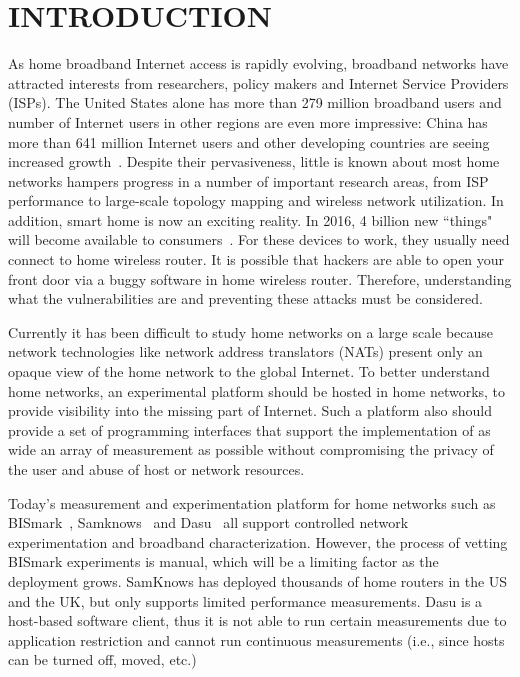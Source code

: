 \chapter{INTRODUCTION}
\label{sec.introduction}
As home broadband Internet access is rapidly evolving, broadband networks 
have attracted interests from researchers, policy makers and Internet 
Service Providers (ISPs). The United States alone has more than 279 million 
broadband users and number of Internet users in other regions are even more 
impressive: China has more than 641 million Internet users and other 
developing countries are seeing increased growth~\cite{asia}. Despite their 
pervasiveness, little is known about most home networks hampers progress in 
a number of important research areas, from ISP performance to large-scale 
topology mapping and wireless network utilization. In addition, smart home is now an exciting reality. In 2016, 4 billion new ``things" will become available to consumers~\cite{gartner}. For these devices to work, they usually need connect to home wireless router. It is possible that hackers are able to open your front door via a buggy software in home wireless router. Therefore, understanding what the vulnerabilities are and preventing these attacks must be considered.

Currently it has been difficult to study home networks on a large scale because network technologies like network address translators (NATs) present only an opaque view of the home network to the global Internet. To better understand home networks, an experimental platform should be hosted in home networks, to provide visibility into the missing part of Internet. Such a platform also should provide a set of programming interfaces that support the implementation of as wide an array of measurement as possible without compromising the privacy of the user and abuse of host or network resources. 

Today's measurement and experimentation platform for home networks such as 
BISmark~\cite{183951}, Samknows~\cite{samknows} and Dasu~\cite{
sanchez2014measurement} all support controlled network experimentation 
and broadband characterization. However, the process of vetting BISmark 
experiments is manual, which will be a limiting factor as the deployment 
grows. SamKnows has deployed thousands of home routers in the US and the UK, 
but only supports limited performance measurements. Dasu is a host-based 
software client, thus it is not able to run certain measurements due to 
application restriction and cannot run continuous measurements (i.e., since 
hosts can be turned off, moved, etc.)
 
